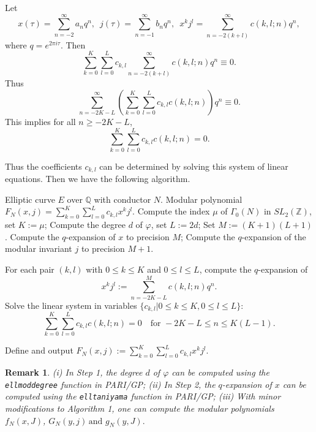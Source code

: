 \documentclass[10pt, a4paper]{article}
\newtheorem{remark}[theorem]{Remark}
\begin{document}
Let \[x(\tau) = \sum_{n=-2}^\infty a_n q^n, \,\,\,
j(\tau) = \sum_{n=-1}^\infty b_n q^n, \,\,\,x^k j^l = \sum_{n=-2(k+l)}^\infty c(k, l; n) q^n,\]
where $q = {e^{2\pi i\tau }}$.
Then
\[
\sum_{k=0}^K \sum_{l=0}^L c_{k,l}\sum_{n=-2(k+l)}^\infty  c(k, l; n) q^n \equiv 0.
\]
Thus \[\sum\limits_{n =  - 2K - L}^\infty  {\left( {\sum\limits_{k = 0}^K {\sum\limits_{l = 0}^L {{c_{k,l}}} } c(k,l;n)} \right){q^n}}  \equiv 0. \]
This implies for all $n \geq -2K - L$,
\[
\sum_{k=0}^K \sum_{l=0}^L c_{k,l} c(k, l; n) = 0.
\]

Thus the coefficients $c_{k,l}$ can be determined
by solving this system of linear equations. Then we have the following algorithm.

\begin{algorithm}[H]
\caption{Construction of Modular Polynomial $F_N(x, j)$}
\label{alg:modular_poly}
\begin{algorithmic}[1]
\REQUIRE Elliptic curve $E$ over $\mathbb{Q}$ with conductor $N$.
\ENSURE Modular polynomial $F_N(x, j) = \sum_{k=0}^{K} \sum_{l=0}^{L} c_{k,l} x^k j^l$.
\STATE Compute the index $\mu$ of $\Gamma_0(N)$ in $SL_2(\mathbb{Z})$, set $K := \mu$;
 Compute the degree $d $ of  $\varphi$, set $L := 2d$;
 Set $M := (K+1)(L+1)$.
\STATE Compute the $q$-expansion of $x$ to precision $M$;
Compute the $q$-expansion of the modular invariant $j$ to precision $M+1$.

\STATE  For each pair $(k,l)$ with $0 \leq k \leq K$ and $0 \leq l \leq L$, compute the $q$-expansion of
\[
x^k j^l := \sum_{n=-2K-L}^{M} c(k,l;n) q^n.
\]
\STATE Solve the linear system in variables $\{c_{k,l}|0 \leq k \leq K, 0 \leq l \leq L\}$:
\[ \sum_{k=0}^{K} \sum_{l=0}^{L} c_{k,l} c(k, l; n) = 0 \quad \text{for } -2K-L \leq n \leq K(L-1). \]

\STATE Define and output $F_N(x, j) := \sum_{k=0}^{K} \sum_{l=0}^{L} c_{k,l} x^k j^l$.
\end{algorithmic}
\end{algorithm}

\begin{remark}
(i) In Step 1,  the degree $d $ of  $\varphi$ can be computed using the \texttt{ellmoddegree} function in PARI/GP;
(ii) In Step 2, the $q$-expansion of $x$ can be computed using the \texttt{elltaniyama} function in PARI/GP;
(iii) With minor modifications to Algorithm 1, one can compute the modular polynomials
$f_N(x, J)$, $  G_N(y, j) \, \text{and}\,\, g_N(y, J).$
\end{remark}
\end{document}
